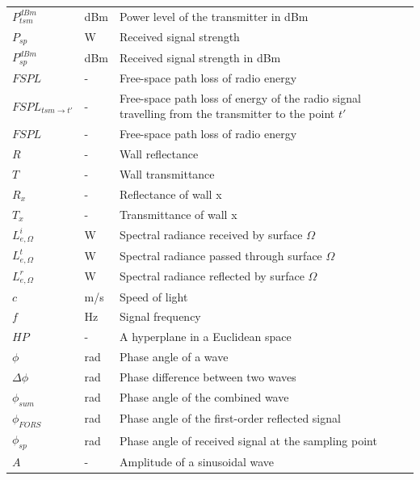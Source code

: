 \documentclass[12pt]{article}
\begin{document}
\begin{longtable*}{l l p{12cm}}
\\
$P_{tsm}^{dBm}$ & \si[per-mode=symbol] {dBm} & Power level of the transmitter in dBm
\\
$P_{sp}$ & \si[per-mode=symbol] {\watt} & Received signal strength
\\
$P_{sp}^{dBm}$ & \si[per-mode=symbol] {dBm} & Received signal strength in dBm
\\
$FSPL$ & \si[per-mode=symbol] {-} & Free-space path loss of radio energy
\\
$FSPL_{tsm\rightarrow t'}$ & \si[per-mode=symbol] {-} & Free-space path loss of 
energy of the radio signal travelling from the transmitter to the point $t'$
\\
$FSPL$ & \si[per-mode=symbol] {-} & Free-space path loss of radio energy
\\
$R$ & \si[per-mode=symbol] {-} & Wall reflectance
\\
$T$ & \si[per-mode=symbol] {-} & Wall transmittance
\\
$R_x$ & \si[per-mode=symbol] {-} & Reflectance of wall x
\\
$T_x$ & \si[per-mode=symbol] {-} & Transmittance of wall x
\\
$L_{e,\Omega}^i$& \si[per-mode=symbol] {\watt} & Spectral radiance received by 
surface $\Omega$
\\
$L_{e,\Omega}^t$& \si[per-mode=symbol] {\watt} & Spectral radiance passed through 
surface $\Omega$
\\
$L_{e,\Omega}^r$& \si[per-mode=symbol] {\watt} & Spectral radiance reflected by 
surface $\Omega$
\\
$c$ & \si[per-mode=symbol] {\metre/\second} & Speed of light
\\
$f$ & \si[per-mode=symbol] {\hertz} & Signal frequency
\\
$HP$ & {-} & A hyperplane in a Euclidean space
\\
$\phi$ & \si[per-mode=symbol] {\radian} & Phase angle of a wave
\\
$\Delta \phi$ & \si[per-mode=symbol] {\radian} & Phase difference between two waves
\\
$\phi_{sum}$ & \si[per-mode=symbol] {\radian} & Phase angle of the combined wave
\\
$\phi_{FORS}$ & \si[per-mode=symbol] {\radian} & Phase angle of the first-order
reflected signal
\\
$\phi_{sp}$ & \si[per-mode=symbol] {\radian} & Phase angle of received signal
at the sampling point
\\
$A$ & {-} & Amplitude of a sinusoidal wave

\end{longtable*}
\end{document}
